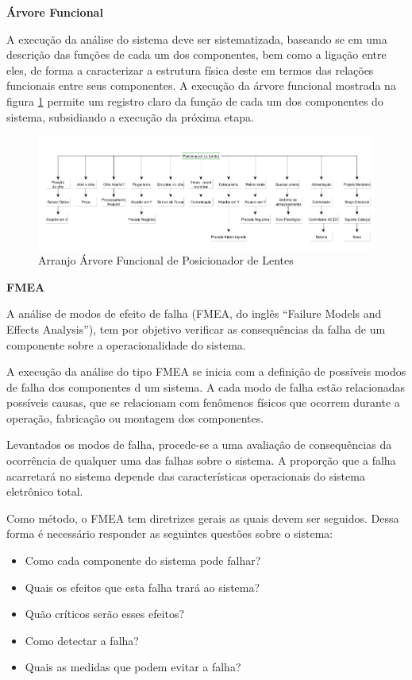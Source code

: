 \textbf{Árvore Funcional}

A execução da análise do sistema deve ser sistematizada, baseando se em uma descrição das funções de cada um dos componentes, bem como a ligação entre eles, de forma a caracterizar a estrutura física deste em termos das relações funcionais entre seus componentes. A execução da árvore funcional mostrada na figura \ref{arvore} permite um registro claro da função de cada um dos componentes do sistema, subsidiando a execução da próxima etapa.

\begin{figure}[H]
		\centering
			\includegraphics[scale=1.0, angle=90]{figuras/arvore.png}
		\caption{Arranjo Árvore Funcional de Posicionador de Lentes}
		\label{arvore}
\end{figure}


\textbf{FMEA}

A análise de modos de efeito de falha (FMEA, do inglês “Failure Models and Effects Analysis”), tem por objetivo verificar as consequências da falha de um componente sobre a operacionalidade do sistema.

A execução da análise do tipo FMEA se inicia com a definição de possíveis modos de falha dos componentes d um sistema. A cada modo de falha estão relacionadas possíveis causas, que se relacionam com fenômenos físicos que ocorrem durante a operação, fabricação ou montagem dos componentes.

Levantados os modos de falha, procede-se a uma avaliação de consequências da ocorrência de qualquer uma das falhas sobre o sistema. A proporção que a falha acarretará no sistema depende das características operacionais do sistema eletrônico total.

Como método, o FMEA tem diretrizes gerais as quais devem ser seguidos. Dessa forma é necessário responder as seguintes questões sobre o sistema:
\begin{itemize}
\item Como cada componente do sistema pode falhar?
\item Quais os efeitos que esta falha trará ao sistema?
\item Quão críticos serão esses efeitos?
\item Como detectar a falha?
\item Quais as medidas que podem evitar a falha?
\end{itemize}

